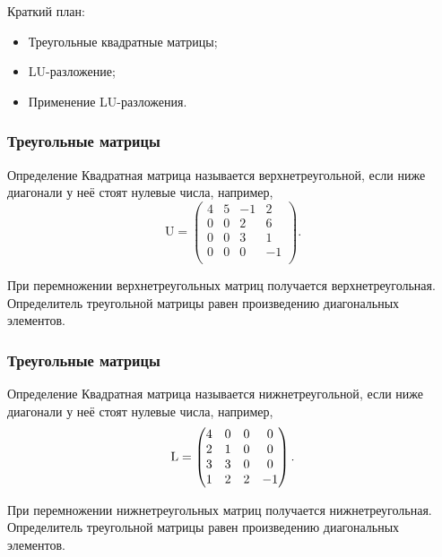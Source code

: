 
\begin{frame} %


\end{frame}



\begin{frame}{Краткий план:}
  \begin{itemize}[<+->]
    \item Треугольные квадратные матрицы;
    \item LU-разложение;
    \item Применение LU-разложения.
  \end{itemize}

\end{frame}



\begin{frame}
    \frametitle{Треугольные матрицы}

    \begin{block}{Определение}
        Квадратная матрица называется \alert{верхнетреугольной},
        если ниже диагонали у неё стоят нулевые числа, например,
        \[
            \mathrm{U} = 
        \begin{pmatrix}
            4 & 5 & -1 & 2 \\
            0 & 0 & 2 & 6 \\
            0 & 0 & 3 & 1 \\
            0 & 0 & 0 & -1 \\
        \end{pmatrix}.    
        \]
    \end{block}
\pause
При перемножении верхнетреугольных матриц получается верхнетреугольная.
\pause
Определитель треугольной матрицы равен произведению диагональных элементов.

\end{frame}


\begin{frame}
\frametitle{Треугольные матрицы}

    \begin{block}{Определение}
        Квадратная матрица называется \alert{нижнетреугольной},
        если ниже диагонали у неё стоят нулевые числа, например,
        \[
            \operatorname{L} =
        \begin{pmatrix}
            4 & 0 & 0 & 0 \\
            2 & 1 & 0 & 0 \\
            3 & 3 & 0 & 0 \\
            1 & 2 & 2 & -1 \\
        \end{pmatrix}.    
        \]
    \end{block}
    \pause
    При перемножении нижнетреугольных матриц получается нижнетреугольная.
    \pause
    Определитель треугольной матрицы равен произведению диагональных элементов.

\end{frame}




